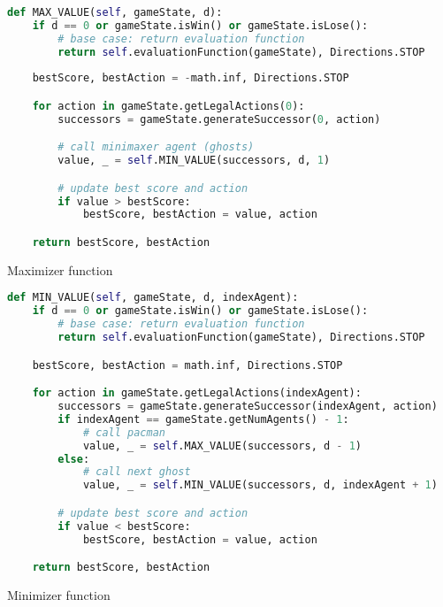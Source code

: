 \documentclass{article}
\begin{document}
\begin{table}[!ht]
\begin{lstlisting}[language=python, frame=tlbr, framesep=6pt, backgroundcolor=\color{light-gray}]
def MAX_VALUE(self, gameState, d):
    if d == 0 or gameState.isWin() or gameState.isLose():
        # base case: return evaluation function
        return self.evaluationFunction(gameState), Directions.STOP
    
    bestScore, bestAction = -math.inf, Directions.STOP

    for action in gameState.getLegalActions(0):
        successors = gameState.generateSuccessor(0, action)

        # call minimaxer agent (ghosts)
        value, _ = self.MIN_VALUE(successors, d, 1)

        # update best score and action
        if value > bestScore:
            bestScore, bestAction = value, action

    return bestScore, bestAction
  \end{lstlisting}
  \caption{Maximizer function}
  \label{tab:minimax-maximizer}
\end{table}

\begin{table}[!ht]
\begin{lstlisting}[language=python, frame=tlbr, framesep=6pt, backgroundcolor=\color{light-gray}]
def MIN_VALUE(self, gameState, d, indexAgent):
    if d == 0 or gameState.isWin() or gameState.isLose():
        # base case: return evaluation function
        return self.evaluationFunction(gameState), Directions.STOP

    bestScore, bestAction = math.inf, Directions.STOP

    for action in gameState.getLegalActions(indexAgent):
        successors = gameState.generateSuccessor(indexAgent, action)
        if indexAgent == gameState.getNumAgents() - 1:
            # call pacman
            value, _ = self.MAX_VALUE(successors, d - 1)
        else:
            # call next ghost
            value, _ = self.MIN_VALUE(successors, d, indexAgent + 1)

        # update best score and action
        if value < bestScore:
            bestScore, bestAction = value, action

    return bestScore, bestAction
\end{lstlisting}
\caption{Minimizer function}
\label{tab:minimax-minimizer}
\end{table}
\end{document}
